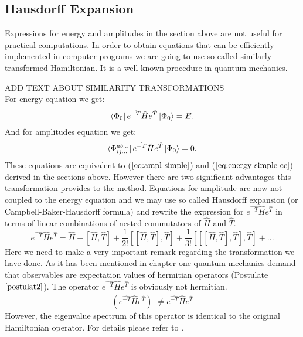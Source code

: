 \documentclass[twoside,english]{uiofysmaster}
\theoremstyle{definition}
\begin{document}
\subsection{Hausdorff Expansion} \label{sec:Hausdorf}
Expressions for energy and amplitudes in the section above are not useful for practical computations. In order to obtain equations that can be efficiently implemented in computer programs we are going to use so called similarly transformed Hamiltonian. It is a well known procedure in quantum mechanics. 

ADD TEXT ABOUT SIMILARITY TRANSFORMATIONS\\
For energy equation we get:
\begin{equation}\label{eq:energy_cc1}
\bra{\Phi_0} e^{\hat{-T}} \hat{H} e^{\hat{T}} \ket{\Phi_0}   = E. 
\end{equation}
And for amplitudes equation we get:
\begin{equation}\label{eq:amplitudesgeneral}
\bra{\Phi_{ij...}^{ab...}}e^{\hat{-T}} \hat{H} e^{\hat{T}} \ket{\Phi_0}   = 0.
\end{equation} 
These equations are equivalent to ($\ref{eq:ampl simple}$) and ($\ref{eq:energy simple cc}$) derived in the sections above. However there are two significant advantages this transformation provides to the method. Equations for amplitude are now not coupled to the energy equation and we may use so called Hausdorff expansion (or Campbell-Baker-Hausdorff formula) and rewrite the expression for $ e^{\hat{-T}} \hat{H} e^{\hat{T}} $ in terms of linear combinations of nested commutators of $ \hat{H} $ and $\hat{T}$.
\begin{equation}
e^{\hat{-T}} \hat{H} e^{\hat{T}} = \hat{H} + [\hat{H},\hat{T}] + \frac{1}{2!}[[\hat{H},\hat{T}],\hat{T}] + \frac{1}{3!}[[[\hat{H},\hat{T}],\hat{T}],\hat{T}] + ...
\end{equation} 
Here we need to make a very important remark regarding the transformation we have done. As it has been mentioned in chapter one quantum mechanics demand that observables are expectation values of hermitian operators (Postulate $\ref{postulat2}$). The operator  $e^{\hat{-T}} \hat{H} e^{\hat{T}} $ is obviously not hermitian. 
\begin{equation}
(e^{\hat{-T}} \hat{H} e^{\hat{T}})^\dagger \neq e^{\hat{-T}} \hat{H} e^{\hat{T}}
\end{equation} 
However, the eigenvalue spectrum of this operator is identical to the original Hamiltonian operator. For details please refer to \cite{kutzelniggAlmostVariationalCoupled}.
\end{document}
